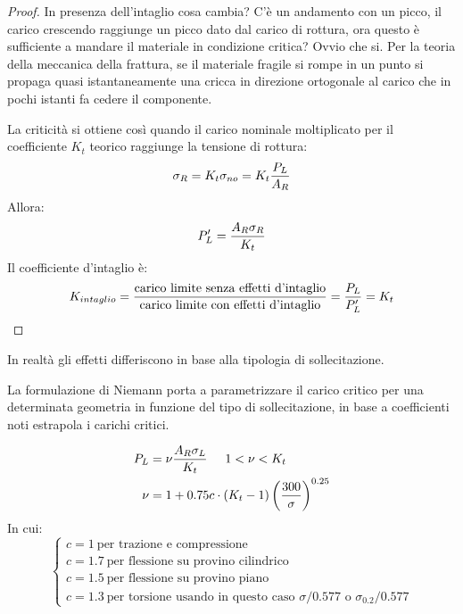 \documentclass{article}
\begin{document}
\begin{adjustwidth}{2in}{}
\begin{proof}
			In presenza dell'intaglio cosa cambia? C'è un andamento con un picco, il carico crescendo raggiunge un picco dato dal carico di rottura, ora questo è sufficiente a mandare il materiale in condizione critica? Ovvio che si. Per la teoria della meccanica della frattura, se il materiale fragile si rompe in un punto si propaga quasi istantaneamente una cricca in direzione ortogonale al carico che in pochi istanti fa cedere il componente. 
			
			La criticità si ottiene così quando il carico nominale moltiplicato per il coefficiente $K_t$ teorico raggiunge la tensione di rottura: 
			\[\sigma_R = K_t\sigma_{no} = K_t{P_L\over A_R}\]
			Allora:
			\[P'_L = {A_R\sigma_R\over K_t}\]
			Il coefficiente d'intaglio è:
			\[K_{intaglio} = \dfrac{\text{carico limite senza effetti d'intaglio}}{\text{carico limite con effetti d'intaglio}} = {P_L\over P'_L} = K_t\]
			 	 
		\end{proof}
		
		In realtà gli effetti differiscono in base alla tipologia di sollecitazione. 
		
		
		La formulazione di Niemann porta a parametrizzare il carico critico per una determinata geometria in funzione del tipo di sollecitazione, in base a coefficienti noti estrapola i carichi critici. 
		
		\[\begin{aligned}
			P_L & = \nu {A_R\sigma_L\over K_t} \hspace{0.5cm} 1<\nu<K_t \\
			\nu & = 1 + 0.75c \cdot (K_t -1)\left(300\over \sigma\right)^{0.25}
		\end{aligned} \]
		In cui:
		\[\begin{cases}
			c = 1 ~ \text{per trazione e compressione} \\
			c = 1.7 ~ \text{per flessione su provino cilindrico} \\
			c = 1.5 ~ \text{per flessione su provino piano } \\
			c = 1.3 ~ \text{per torsione usando in questo caso $\sigma/0.577$ o $\sigma_{0.2}/0.577$}			
		\end{cases}\]
		
		
		
		
		
		
		 
		
		
		
		
	
 		
 		

\end{adjustwidth}
\end{document}
